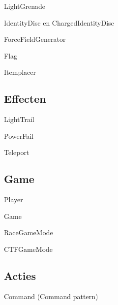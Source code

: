 \documentclass[11pt,t]{beamer}
\begin{document}
\begin{frame}{LightGrenade}
\end{frame}

\begin{frame}{IdentityDisc en ChargedIdentityDisc}
\end{frame}

\begin{frame}{ForceFieldGenerator}
\end{frame}

\begin{frame}{Flag}
\end{frame}

\begin{frame}{Itemplacer}
\end{frame}

\subsection{Effecten}

\begin{frame}{LightTrail}
\end{frame}

\begin{frame}{PowerFail}
\end{frame}

\begin{frame}{Teleport}
\end{frame}

\subsection{Game}

\begin{frame}{Player}
\end{frame}

\begin{frame}{Game}
\end{frame}

\begin{frame}{RaceGameMode}
\end{frame}

\begin{frame}{CTFGameMode}
\end{frame}

\subsection{Acties}

\begin{frame}{Command (Command pattern)}
\end{frame}
\end{document}
